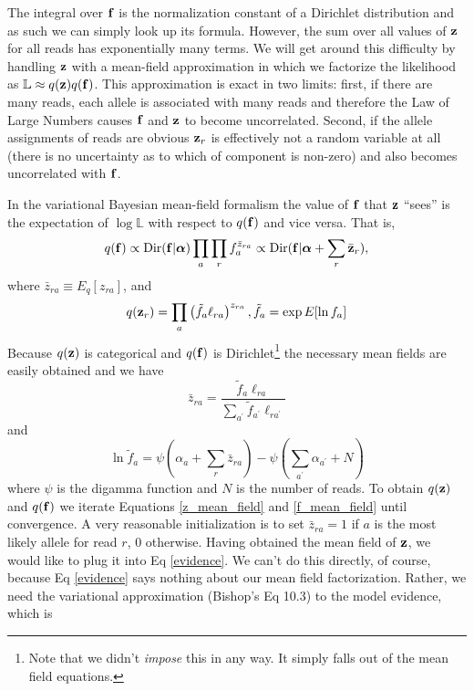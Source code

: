 \documentclass[nofootinbib,amssymb,amsmath]{revtex4}
\newcommand{\vf}{{\bf f}}
\newcommand{\vz}{{\bf z}}
\newcommand{\valpha}{{\bm{\alpha}}}
\begin{document}
The integral over $\vf$ is the normalization constant of a Dirichlet distribution and as such we can simply look up its formula.  However, the sum over all values of $\vz$ for all reads has exponentially many terms.  We will get around this difficulty by handling $\vz$ with a mean-field approximation in which we factorize the likelihood as $\mathbb{L} \approx q(\vz) q(\vf)$.  This approximation is exact in two limits: first, if there are many reads, each allele is associated with many reads and therefore the Law of Large Numbers causes $\vf$ and $\vz$ to become uncorrelated.  Second, if the allele assignments of reads are obvious $\vz_r$ is effectively not a random variable at all (there is no uncertainty as to which of component is non-zero) and also becomes uncorrelated with $\vf$.

In the variational Bayesian mean-field formalism the value of $\vf$ that $\vz$ ``sees'' is the expectation of $\log \mathbb{L}$ with respect to $q(\vf)$ and vice versa.  That is,
\begin{equation}
q(\vf) \propto {\rm Dir}(\vf | \valpha) \prod_a  \prod_r f_a^{\bar{z}_{ra}} \propto {\rm Dir}(\vf | \valpha + \sum_r \bar{\vz}_r),
\label{qf}
\end{equation}
where $\bar{z}_{ra} \equiv E_q \left[ z_{ra} \right]$, and
\begin{equation}
q(\vz_r) = \prod_a \left( \tilde{f}_a \ell_{ra}\right)^{z_{ra}}, \tilde{f}_a = \exp E[\ln f_a]
\end{equation}
Because $q(\vz)$ is categorical and $q(\vf)$ is Dirichlet\footnote{Note that we didn't \textit{impose} this in any way.  It simply falls out of the mean field equations.} the necessary mean fields are easily obtained and we have
\begin{equation}
\bar{z}_{ra} = \frac{\tilde{f}_a \ell_{ra}}{\sum_{a^\prime} \tilde{f}_{a^\prime} \ell_{ra^\prime}}
\label{z_mean_field}
\end{equation}
and
\begin{equation}
\ln \tilde{f}_a = \psi(\alpha_a + \sum_r \bar{z}_{ra}) - \psi(\sum_{a^\prime} \alpha_{a^\prime} + N)
\label{f_mean_field}
\end{equation}
where $\psi$ is the digamma function and $N$ is the number of reads.  To obtain $q(\vz)$ and $q(\vf)$ we iterate Equations \ref{z_mean_field} and \ref{f_mean_field} until convergence.  A very reasonable initialization is to set $\bar{z}_{ra} = 1$ if $a$ is the most likely allele for read $r$, 0 otherwise.  Having obtained the mean field of $\vz$, we would like to plug it into Eq \ref{evidence}.  We can't do this directly, of course, because Eq \ref{evidence} says nothing about our mean field factorization.  Rather, we need the variational approximation (Bishop's Eq 10.3) to the model evidence, which is
\end{document}
